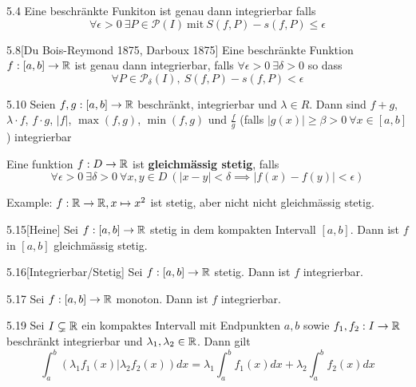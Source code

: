 \begin{satz}{5.4}
    Eine beschränkte Funkiton ist genau dann integrierbar falls
    \[ \forall \epsilon > 0\ \exists P \in \mathcal{P}(I)\ \mbox{mit}\ S(f, P) - s(f, P) \le \epsilon \]
\end{satz}

\begin{satz}{5.8}[Du Bois-Reymond 1875, Darboux 1875]
    Eine beschränkte Funktion $f: [a, b] \to \mathbb{R}$ ist genau dann integrierbar, falls $\forall \epsilon > 0\ \exists \delta > 0$
    so dass
    \[ \forall P \in \mathcal{P}_\delta(I),\ S(f, P) - s(f, P) < \epsilon \]
\end{satz}

\begin{satz}{5.10}
    Seien $f, g: [a, b] \to \mathbb{R}$ beschränkt, integrierbar und $\lambda \in R$. Dann sind $f + g$, $\lambda \cdot f$, $f \cdot g$, $|f|$,
    $\max(f, g)$, $\min(f, g)$ und $\frac{f}{g}$ (falls $|g(x)| \ge \beta > 0\ \forall x \in [a, b]$) integrierbar
\end{satz}

\begin{definition}
    Eine funktion $f: D \to \mathbb{R}$ ist \textbf{gleichmässig stetig}, falls
    \[ \forall \epsilon > 0\ \exists \delta > 0\ \forall x,y \in D\ \left( |x - y| < \delta \implies |f(x) - f(y)| < \epsilon \right) \]

    Example: $f: \mathbb{R} \to \mathbb{R}, x \mapsto x^2$ ist stetig, aber nicht nicht gleichmässig stetig.
\end{definition}

\begin{satz}{5.15}[Heine]
    Sei $f: [a,b] \to \mathbb{R}$ stetig in dem kompakten Intervall $[a,b]$. Dann ist $f$ in $[a,b]$ gleichmässig stetig.
\end{satz}

\begin{satz}{5.16}[Integrierbar/Stetig]
    Sei $f: [a,b] \to \mathbb{R}$ stetig. Dann ist $f$ integrierbar.
\end{satz}

\begin{satz}{5.17}
    Sei $f: [a,b] \to \mathbb{R}$ monoton. Dann ist $f$ integrierbar.
\end{satz}

\begin{satz}{5.19}
    Sei $I \subsetneq \mathbb{R}$ ein kompaktes Intervall mit Endpunkten $a, b$ sowie $f_1, f_2: I \to \mathbb{R}$ beschränkt integrierbar
    und $\lambda_1,\lambda_2 \in \mathbb{R}$. Dann gilt
    \[ \int_a^b (\lambda_1 f_1(x) | \lambda_2 f_2(x)) dx = \lambda_1 \int_a^b f_1(x)dx + \lambda_2 \int_a^b f_2(x) dx \]
\end{satz}

